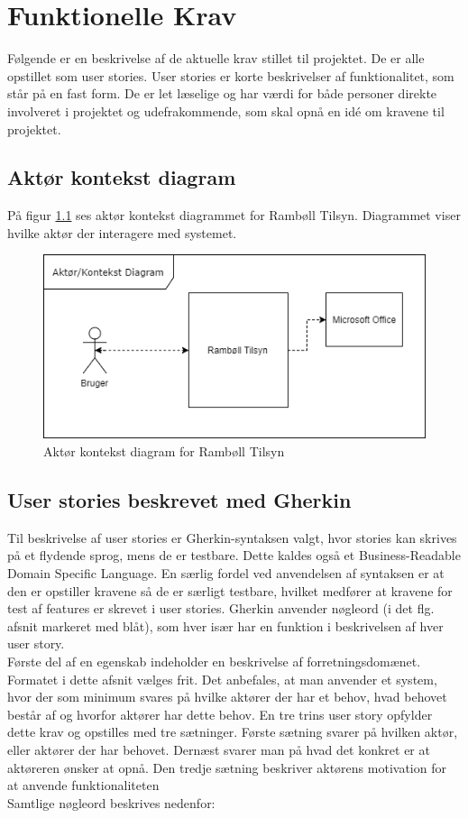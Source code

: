 \chapter{Funktionelle Krav} \label{sec:FunktionelleKrav}
Følgende er en beskrivelse af de aktuelle krav stillet til projektet. De er alle opstillet som user stories. User stories er korte beskrivelser af funktionalitet, som står på en fast form. De er let læselige og har værdi for både personer direkte involveret i projektet og udefrakommende, som skal opnå en idé om kravene til projektet. 

\section{Aktør kontekst diagram}\label{sec:Aktor}
	På figur \ref{fig:AktorKontekst} ses aktør kontekst diagrammet for Rambøll Tilsyn. Diagrammet viser hvilke aktør der interagere med systemet.
\begin{figure}[H]
	\centering
	\includegraphics[width=0.5\linewidth]{FunktionelleKrav/AktorDiagram}
	\caption{Aktør kontekst diagram for Rambøll Tilsyn}
	\label{fig:AktorKontekst}
\end{figure}


\section{User stories beskrevet med Gherkin}
Til beskrivelse af user stories er Gherkin-syntaksen valgt, hvor stories 
kan skrives på et flydende sprog, mens de er testbare.\cite{Gherkin} Dette kaldes også et Business-Readable Domain  
Specific Language. En særlig fordel ved anvendelsen af syntaksen er at den er opstiller kravene så de er særligt testbare, hvilket medfører at kravene for test af features er skrevet i user stories.
Gherkin anvender nøgleord (i det flg. afsnit 
markeret med blåt), som hver især har en funktion i beskrivelsen af hver 
user story.  \vspace{0.2 cm}\\
Første del af en egenskab indeholder en beskrivelse af forretningsdomænet. 
Formatet i	dette afsnit vælges frit. Det anbefales, at man anvender et 
system, hvor der som minimum svares på hvilke aktører der har et behov, hvad 
behovet består af og hvorfor aktører har dette behov. En tre trins user 
story opfylder dette krav og opstilles med tre 
sætninger. Første sætning svarer på hvilken aktør, eller aktører der har
behovet. Dernæst svarer man på hvad det konkret er at aktøreren ønsker at 
opnå. Den tredje sætning beskriver aktørens motivation for at anvende 
funktionaliteten\\
Samtlige nøgleord beskrives nedenfor:

